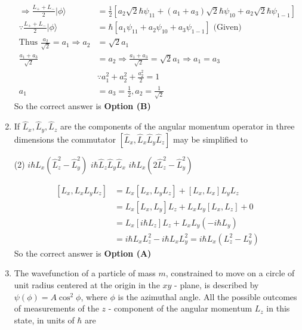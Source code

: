 \begin{enumerate}
\begin{answer}
\begin{align*}
\Rightarrow \frac{L_{+}+L_{-}}{2}|\phi\rangle&=\frac{1}{2}\left[a_{2} \sqrt{2} \hbar \psi_{11}+\left(a_{1}+a_{3}\right) \sqrt{2} \hbar \psi_{10}+a_{2} \sqrt{2} \hbar \psi_{1-1}\right]\\
\because \frac{L_{+}+L_{-}}{2}|\phi\rangle&=\hbar\left[a_{1} \psi_{11}+a_{2} \psi_{10}+a_{3} \psi_{1-1}\right]\text{ (Given)}\\\text{Thus }\frac{a_{2}}{\sqrt{2}}=a_{1} \Rightarrow a_{2}&=\sqrt{2} a_{1}\\
\frac{a_{1}+a_{3}}{\sqrt{2}}&=a_{2} \Rightarrow \frac{a_{1}+a_{3}}{\sqrt{2}}=\sqrt{2} a_{1} \Rightarrow a_{1}=a_{3} \\& \because a_{1}^{2}+a_{2}^{2}+\frac{a_{2}^{2}}{2}=1\\
a_{1}&=a_{3}=\frac{1}{2}, a_{2}=\frac{1}{\sqrt{2}}
\end{align*}
So the correct answer is \textbf{Option (B)}
\end{answer}	
\item If $\hat{L}_{x}, \hat{L}_{y}, \hat{L}_{z}$ are the components of the angular momentum operator in three dimensions the commutator $\left[\hat{L}_{x}, \hat{L}_{x} \hat{L}_{y} \hat{L}_{z}\right]$ may be simplified to
{}
\begin{tasks}(2)
\task[\textbf{A.}] $i \hbar L_{x}\left(\hat{L}_{z}^{2}-\hat{L}_{y}^{2}\right)$
\task[\textbf{B.}] $i \hbar \hat{L}_{z} \hat{L}_{y} \hat{L}_{x}$
\task[\textbf{C.}] $i \hbar L_{x}\left(2 \hat{L}_{z}^{2}-\hat{L}_{y}^{2}\right)$
\end{tasks}
\begin{answer}
\begin{align*}
\left[L_{x}, L_{x} L_{y} L_{z}\right]&=L_{x}\left[L_{x}, L_{y} L_{z}\right]+\left[L_{x}, L_{x}\right] L_{y} L_{z}\\
&=L_{x}\left[L_{x}, L_{y}\right] L_{z}+L_{x} L_{y}\left[L_{x}, L_{z}\right]+0\\&=L_{x}\left[i \hbar L_{z}\right] L_{z}+L_{x} L_{y}\left(-i \hbar L_{y}\right)\\
&=i \hbar L_{x} L_{z}^{2}-i \hbar L_{x} L_{y}^{2}=i \hbar L_{x}\left(L_{z}^{2}-L_{y}^{2}\right)
\end{align*}
So the correct answer is \textbf{Option (A)}
\end{answer}	
\item The wavefunction of a particle of mass $m$, constrained to move on a circle of unit radius centered at the origin in the $x y$ - plane, is described by $\psi(\phi)=A \cos ^{2} \phi$, where $\phi$ is the azimuthal angle. All the possible outcomes of measurements of the $z$ - component of the angular momentum $L_{z}$ in this state, in units of $\hbar$ are

\end{enumerate}
